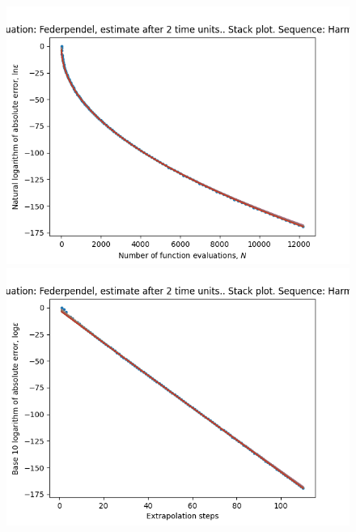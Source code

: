 \begin{figure}[H]
\centering
\begin{minipage}{0.45\textwidth}
\centering
\includegraphics[scale=0.45]{emr_plots/federpendel_2_hp_harmonic_stack.png}
\end{minipage}
\begin{minipage}{0.45\textwidth}
\centering
\includegraphics[scale=0.45]{emr_plots/federpendel_2_hp_harmonic_steps_stack.png}
\end{minipage}
\end{figure}

